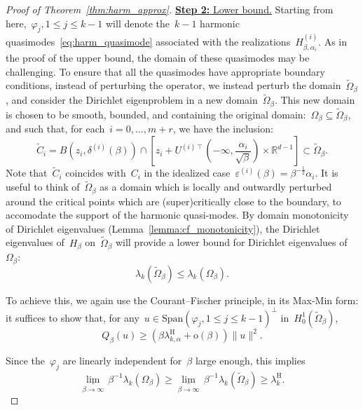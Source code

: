 \documentclass[10pt]{article}
\newcommand{\R}{\mathbb{R}}
\newcommand{\1}{\mathbbm 1}
\newcommand{\deltai}{\delta^{(i)}}
\renewcommand{\o}{\mathrm{o}}
\begin{document}
\begin{proof}[Proof of Theorem~\ref{thm:harm_approx}]
        {\underline{{\bf Step 2: }Lower bound.}\newline}
        Starting from here,~$\varphi_{j}, 1\leq j \leq k-1$ will denote the~$k-1$ harmonic quasimodes~\eqref{eq:harm_quasimode} associated with the realizations~$H^{(i)}_{\beta,\alpha_i}$.
        As in the proof of the upper bound, the domain of these quasimodes may be challenging.
        To ensure that all the quasimodes have appropriate boundary conditions, instead of perturbing the operator, we instead perturb the domain~$\widetilde\Omega_\beta$, and consider the Dirichlet eigenproblem in a new domain~$\widetilde\Omega_\beta$. This new domain is chosen to be smooth, bounded, and containing the original domain:~$\Omega_\beta \subseteq \widetilde\Omega_\beta$, and such that, for each~$i=0,\dots,m+r$, we have the inclusion:
        \begin{equation}
            \label{eq:outward_perturbation}
            \widetilde C_i = B(z_i,\deltai(\beta)) \cap \left[z_i + U^{(i)\intercal} (-\infty,\frac{\alpha_i}{\sqrt\beta})\times \R^{d-1}\right]\subset\widetilde\Omega_\beta.
        \end{equation}
        Note that~$\widetilde C_i$ coincides with~$C_i$ in the idealized case~$\varepsilon^{(i)}(\beta) = \beta^{-\frac12}\alpha_i$. It is useful to think of~$\widetilde\Omega_\beta$ as a domain which is locally and outwardly perturbed around the critical points which are (super)critically close to the boundary, to accomodate the support of the harmonic quasi-modes.
        By domain monotonicity of Dirichlet eigenvalues (Lemma~\ref{lemma:cf_monotonicity}), the Dirichlet eigenvalues of~$H_\beta$ on~$\widetilde\Omega_\beta$ will provide a lower bound for Dirichlet eigenvalues of~$\Omega_\beta$:
        \[ \lambda_{k}(\widetilde\Omega_\beta) \leq \lambda_{k}(\Omega_\beta).\]

        To achieve this, we again use the Courant--Fischer principle, in its Max-Min form: it suffices to show that, for any~$u \in \mathrm{Span}(\varphi_j, 1\leq j \leq k-1)^\perp$ in~$H_0^1(\widetilde\Omega_\beta)$, 
       ~$$ Q_\beta(u) \geq (\beta\lambda_{k,\alpha}^{\mathrm{H}} + \o(\beta))\|u\|^2.$$

        Since the~$\varphi_j$ are linearly independent for~$\beta$ large enough, this implies
        \[\underset{\beta\to\infty}{\underline\lim}\,\beta^{-1}\lambda_{k}(\Omega_\beta)\geq\underset{\beta\to\infty}{\underline\lim}\,\beta^{-1}\lambda_{k}(\widetilde\Omega_\beta) \geq \lambda_k^{\mathrm{H}}.\]
        

\end{proof}
\end{document}
